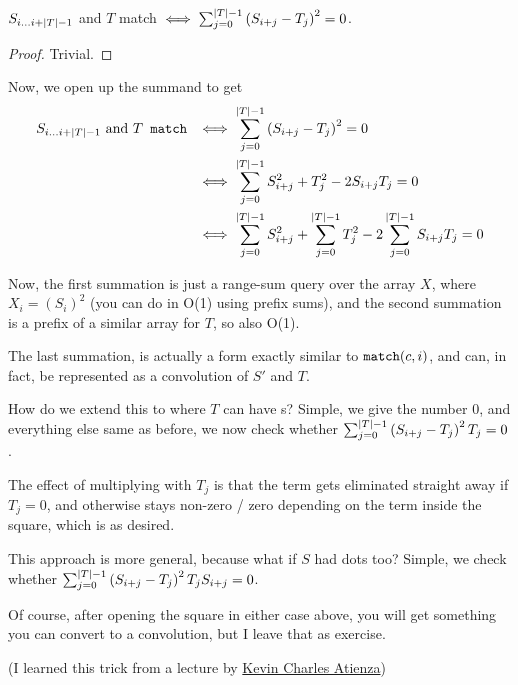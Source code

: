 		\begin{claim}
			$S_{i\dots i + \mid T\mid - 1}$ and $T$ match $\iff
			\sum_{j = 0}^{\mid T\mid - 1} \left(S_{i + j} - T_{j}\right) ^ 2 = 0$.
		\end{claim}

		\begin{proof}
			Trivial.
		\end{proof}

		Now, we open up the summand to get
		\begin{align*}
			S_{i\dots i + \mid T\mid - 1} \text{ and } T \texttt{ match }
			&\iff
			\sum_{j = 0}^{\mid T\mid - 1} \left(S_{i + j} - T_{j}\right) ^ 2 = 0 \\
			&\iff
			\sum_{j = 0}^{\mid T\mid - 1} S_{i + j}^2 + T_{j}^2 - 2S_{i + j}T_j = 0\\
			&\iff
			\sum_{j = 0}^{\mid T\mid - 1} S_{i +j}^2 + 
			\sum_{j = 0}^{\mid T\mid - 1} T_j^2 -
			2\sum_{j = 0}^{\mid T\mid - 1} S_{i + j}T_j = 0\\
		\end{align*}

		Now, the first summation is just a range-sum query over the array
		$X$, where $X_i = \left(S_i\right)^2$ (you can do in O(1) using prefix sums),
		and the second summation is a prefix of a similar array for $T$, so also O(1).

		The last summation, is actually a form exactly similar to $\texttt{match}(c, i)$,
		and can, in fact, be represented as a convolution of $S'$ and $T$.

		How do we extend this to where $T$ can have s?
		Simple, we give  the number $0$, and everything else same as before,
		we now check whether 
		$\sum_{j = 0}^{\mid T\mid - 1} \left(S_{i + j} - T_{j}\right)^2T_j = 0$.

		The effect of multiplying with $T_j$ is that the term gets eliminated straight
		away if $T_j = 0$, and otherwise stays non-zero / zero depending on the term
		inside the square, which is as desired.

		This approach is more general, because what if $S$ had dots too?
		Simple, we check whether
		$\sum_{j = 0}^{\mid T\mid - 1} \left(S_{i + j} - T_{j}\right)^2T_jS_{i + j} = 0$.

		Of course, after opening the square in either case above, you will get something you
		can convert to a convolution, but I leave that as exercise.

		(I learned this trick from a lecture by
		\href{http://codeforces.com/profile/kevinsogo}{Kevin Charles Atienza})

